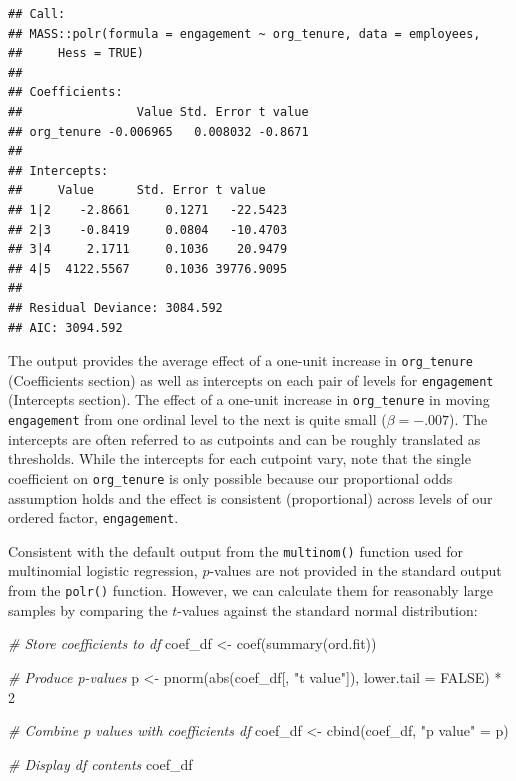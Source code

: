 \documentclass[
]{book}
\newenvironment{Shaded}{\begin{snugshade}}{\end{snugshade}}
\newcommand{\AttributeTok}[1]{\textcolor[rgb]{0.77,0.63,0.00}{#1}}
\newcommand{\CommentTok}[1]{\textcolor[rgb]{0.56,0.35,0.01}{\textit{#1}}}
\newcommand{\ConstantTok}[1]{\textcolor[rgb]{0.00,0.00,0.00}{#1}}
\newcommand{\DecValTok}[1]{\textcolor[rgb]{0.00,0.00,0.81}{#1}}
\newcommand{\FunctionTok}[1]{\textcolor[rgb]{0.00,0.00,0.00}{#1}}
\newcommand{\NormalTok}[1]{#1}
\newcommand{\OtherTok}[1]{\textcolor[rgb]{0.56,0.35,0.01}{#1}}
\newcommand{\SpecialCharTok}[1]{\textcolor[rgb]{0.00,0.00,0.00}{#1}}
\newcommand{\StringTok}[1]{\textcolor[rgb]{0.31,0.60,0.02}{#1}}
\begin{document}
\begin{verbatim}
## Call:
## MASS::polr(formula = engagement ~ org_tenure, data = employees, 
##     Hess = TRUE)
## 
## Coefficients:
##                Value Std. Error t value
## org_tenure -0.006965   0.008032 -0.8671
## 
## Intercepts:
##     Value      Std. Error t value   
## 1|2    -2.8661     0.1271   -22.5423
## 2|3    -0.8419     0.0804   -10.4703
## 3|4     2.1711     0.1036    20.9479
## 4|5  4122.5567     0.1036 39776.9095
## 
## Residual Deviance: 3084.592 
## AIC: 3094.592
\end{verbatim}

The output provides the average effect of a one-unit increase in \texttt{org\_tenure} (Coefficients section) as well as intercepts on each pair of levels for \texttt{engagement} (Intercepts section). The effect of a one-unit increase in \texttt{org\_tenure} in moving \texttt{engagement} from one ordinal level to the next is quite small (\(\beta = -.007\)). The intercepts are often referred to as cutpoints and can be roughly translated as thresholds. While the intercepts for each cutpoint vary, note that the single coefficient on \texttt{org\_tenure} is only possible because our proportional odds assumption holds and the effect is consistent (proportional) across levels of our ordered factor, \texttt{engagement}.

Consistent with the default output from the \texttt{multinom()} function used for multinomial logistic regression, \(p\)-values are not provided in the standard output from the \texttt{polr()} function. However, we can calculate them for reasonably large samples by comparing the \(t\)-values against the standard normal distribution:

\begin{Shaded}
\begin{Highlighting}[]
\CommentTok{\# Store coefficients to df}
\NormalTok{coef\_df }\OtherTok{\textless{}{-}} \FunctionTok{coef}\NormalTok{(}\FunctionTok{summary}\NormalTok{(ord.fit))}

\CommentTok{\# Produce p{-}values}
\NormalTok{p }\OtherTok{\textless{}{-}} \FunctionTok{pnorm}\NormalTok{(}\FunctionTok{abs}\NormalTok{(coef\_df[, }\StringTok{"t value"}\NormalTok{]), }\AttributeTok{lower.tail =} \ConstantTok{FALSE}\NormalTok{) }\SpecialCharTok{*} \DecValTok{2}

\CommentTok{\# Combine p values with coefficients df}
\NormalTok{coef\_df }\OtherTok{\textless{}{-}} \FunctionTok{cbind}\NormalTok{(coef\_df, }\StringTok{"p value"} \OtherTok{=}\NormalTok{ p)}

\CommentTok{\# Display df contents}
\NormalTok{coef\_df}
\end{Highlighting}
\end{Shaded}
\end{document}
